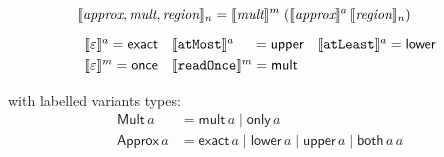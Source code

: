 \begin{align*}
\setlength{\arraycolsep}{0.7em}
& \interp{\textit{approx}, \textit{mult}, \textit{region}}_n
= \interp{\textit{mult}}^m \; (\interp{\textit{approx}}^a \,
\interp{\textit{region}}_n) \\[0.5em]
& \begin{array}{lll}
\interp{\varepsilon}^{a}   = \textsf{exact} &
\interp{\term{atMost}}^{a} \hspace{1.3em} = \textsf{upper} &
\interp{\term{atLeast}}^{a} = \textsf{lower} \\[0.3em]
\interp{\varepsilon}^{m} = \textsf{once}
& \interp{\term{readOnce}}^{m} = \textsf{mult} & 
\end{array}\\[0.5em]
\end{align*}
%
with labelled variants types:
%
\begin{align*}
\textsf{Mult} \, a & = \textsf{mult} \, a \mid \textsf{only} \, a \\
\textsf{Approx} \, a & = \textsf{exact} \, a \mid \textsf{lower} \, a \mid
\textsf{upper} \, a \mid \textsf{both} \, a \, a
\end{align*}


